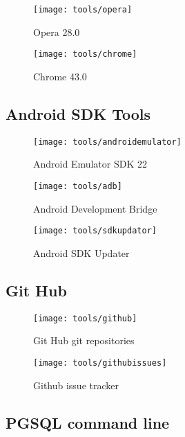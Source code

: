\begin{figure}[h]
    \centering
    \texttt{[image: tools/opera]}
    \caption{Opera 28.0}
    \label{fig:opera_image}
\end{figure} 
\noindent

\begin{figure}[h]
    \centering
    \texttt{[image: tools/chrome]}
    \caption{Chrome 43.0}
    \label{fig:opera_image}
\end{figure} 
\noindent

\subsection*{Android SDK Tools}

\begin{figure}[h]
    \centering
    \texttt{[image: tools/androidemulator]}
    \caption{Android Emulator SDK 22}
    \label{fig:android_emulator}
\end{figure} 
\noindent

\begin{figure}[h]
    \centering
    \texttt{[image: tools/adb]}
    \caption{Android Development Bridge}
    \label{fig:adb_image}
\end{figure} 
\noindent

\begin{figure}[h]
    \centering
    \texttt{[image: tools/sdkupdator]}
    \caption{Android SDK Updater}
    \label{fig:sdk_updator}
\end{figure} 
\noindent

\subsection*{Git Hub}

\begin{figure}[h]
    \centering
    \texttt{[image: tools/github]}
    \caption{Git Hub git repositories}
    \label{fig:git_hub_repos_image}
\end{figure} 
\noindent

\begin{figure}[h]
    \centering
    \texttt{[image: tools/githubissues]}
    \caption{Github issue tracker}
    \label{fig:gh_issue_tracker_image}
\end{figure} 
\noindent

\subsection*{PGSQL command line}

